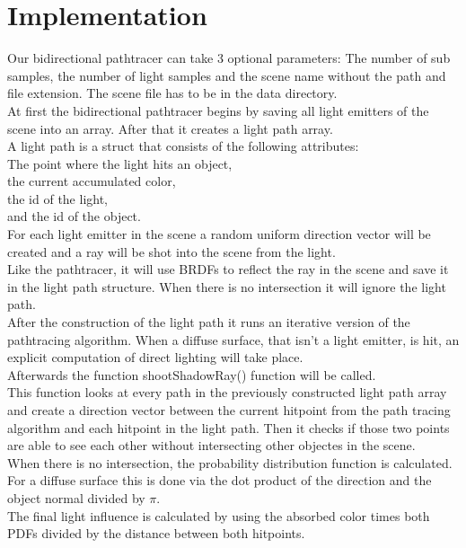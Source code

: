 \section{Implementation}
Our bidirectional pathtracer can take 3 optional parameters: The number of sub samples, the number of light samples and the scene name without the path and file extension. The scene file has to be in the data directory.\\

At first the bidirectional pathtracer begins by saving all light emitters of the scene into an array.
After that it creates a light path array.\\

A light path is a struct that consists of the following attributes:\\
The point where the light hits an object,\\
the current accumulated color,\\
the id of the light,\\
and the id of the object.\\

For each light emitter in the scene a random uniform direction vector will be created and a ray will be shot into the scene from the light.\\
Like the pathtracer, it will use BRDFs to reflect the ray in the scene and save it in the light path structure. When there is no intersection it will ignore the light path.\\

After the construction of the light path it runs an iterative version of the pathtracing algorithm. When a diffuse surface, that isn't a light emitter, is hit, an explicit computation of direct lighting will take place.\\
Afterwards the function shootShadowRay() function will be called.\\
This function looks at every path in the previously constructed light path array and create a direction vector between the current hitpoint from the path tracing algorithm and each hitpoint in the light path.
Then it checks if those two points are able to see each other without intersecting other objectes in the scene.\\
When there is no intersection, the probability distribution function is calculated. For a diffuse surface this is done via the dot product of the direction and the object normal divided by \(\pi\).\\
The final light influence is calculated by using the absorbed color times both PDFs divided by the distance between both hitpoints.

